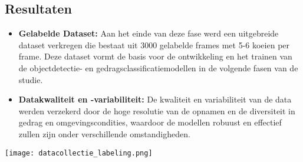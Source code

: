 \subsection{Resultaten}
\begin{itemize}
  \item \textbf{Gelabelde Dataset:}  Aan het einde van deze fase werd een uitgebreide dataset verkregen die bestaat uit 3000 gelabelde frames met 5-6 koeien per frame. Deze dataset vormt de basis voor de ontwikkeling en het trainen van de objectdetectie- en gedragsclassificatiemodellen in de volgende fasen van de studie.
  \item \textbf{Datakwaliteit en -variabiliteit:} De kwaliteit en variabiliteit van de data werden verzekerd door de hoge resolutie van de opnamen en de diversiteit in gedrag en omgevingscondities, waardoor de modellen robuust en effectief zullen zijn onder verschillende omstandigheden.
\end{itemize}
\newline
\texttt{[image: datacollectie\_labeling.png]}
\newline